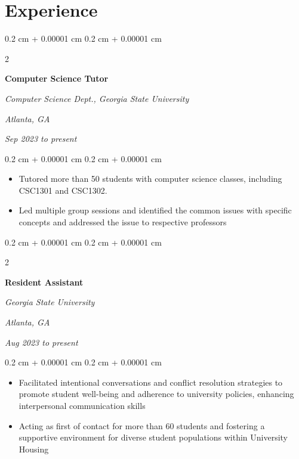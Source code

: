 \documentclass[12pt, letterpaper]{article}
\newenvironment{highlights}{
    \begin{itemize}[
        topsep=0.10 cm,
        parsep=0.10 cm,
        partopsep=0pt,
        itemsep=0pt,
        leftmargin=0.4 cm + 10pt
    ]
}{
    \end{itemize}
} %
\newenvironment{onecolentry}{
    \begin{adjustwidth}{
        0.2 cm + 0.00001 cm
    }{
        0.2 cm + 0.00001 cm
    }
}{
    \end{adjustwidth}
} %
\newenvironment{twocolentry}[2][]{
    \onecolentry
    \def\secondColumn{#2}
    \setcolumnwidth{\fill, 4.5 cm}
    \begin{paracol}{2}
}{
    \switchcolumn \raggedleft \secondColumn
    \end{paracol}
    \endonecolentry
} %
\begin{document}
    
    \section{Experience}



        
        \begin{twocolentry}{
        \textit{Atlanta, GA}

        \textit{Sep 2023 to present}}
            \textbf{Computer Science Tutor}

            \textit{Computer Science Dept., Georgia State University}
        \end{twocolentry}

        \vspace{0.10 cm}
        \begin{onecolentry}
            \begin{highlights}
                \item Tutored more than 50 students with computer science classes, including CSC1301 and CSC1302.
                \item Led multiple group sessions and identified the common issues with specific concepts and addressed the issue to respective professors
            \end{highlights}
        \end{onecolentry}


        \vspace{0.2 cm}

        \begin{twocolentry}{
        \textit{Atlanta, GA}

        \textit{Aug 2023 to present}}
            \textbf{Resident Assistant}

            \textit{Georgia State University}
        \end{twocolentry}

        \vspace{0.10 cm}
        \begin{onecolentry}
            \begin{highlights}
                \item Facilitated intentional conversations and conflict resolution strategies to promote student well-being and adherence to university policies, enhancing interpersonal communication skills
                \item Acting as first of contact for more than 60 students and fostering a supportive environment for diverse student populations within University Housing
            \end{highlights}
        \end{onecolentry}
\end{document}
